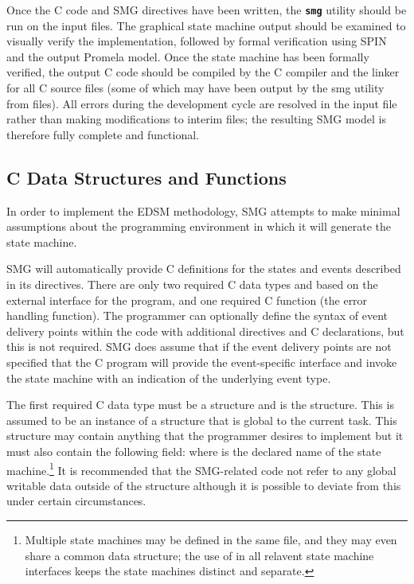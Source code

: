 Once the C code and SMG directives have been written, the {\bf\tt smg}
utility should be run on the  input files.  The graphical
state machine output should be examined to visually verify the
implementation, followed by formal verification using SPIN and the
output Promela model.  Once the state machine has been formally
verified, the output C code should be compiled by the C compiler and
the linker for all C source files (some of which may have been output
by the smg utility from  files).  All errors during the
development cycle are resolved in the input  file rather
than making modifications to interim files; the resulting SMG model is
therefore fully complete and functional.

\begin{figure*}

\end{figure*}
%

\subsection{C Data Structures and Functions}

In order to implement the EDSM methodology, SMG attempts to make
minimal assumptions about the programming environment in which it will
generate the state machine.

SMG will automatically provide C definitions for the states and events
described in its directives.  There are only two required C data types
and based on the external interface for the program, and one required
C function (the error handling function).  The programmer can
optionally define the syntax of event delivery points within the code
with additional directives and C declarations, but this is not
required.  SMG does assume that if the event delivery points are not
specified that the C program will provide the event-specific interface
and invoke the state machine with an indication of the underlying
event type.

The first required C data type must be a structure and is the \SMOBJ
structure.  This is assumed to be an instance of a structure that is
global to the current task.  This structure may contain anything that
the programmer desires to implement but it must also contain the
following field:  where
 is the declared name of the state
machine.\footnote{Multiple state machines may be defined in the same
   file, and they may even share a common \SMOBJ data
  structure; the use of  in all relavent state machine
  interfaces keeps the state machines distinct and separate.}  It is
recommended that the SMG-related code not refer to any global writable
data outside of the \SMOBJ structure although it is possible to
deviate from this under certain circumstances.

